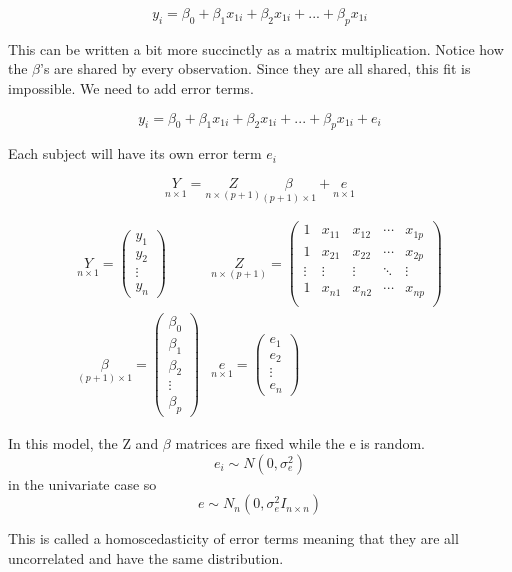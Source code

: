 \[y_i = \beta_0+ \beta_1 x_{1i}+ \beta_2 x_{1i} + ...+\beta_p x_{1i}\]

This can be written a bit more succinctly as a matrix multiplication. Notice how the $\beta$'s are shared by every observation. Since they are all shared, this fit is impossible. We need to add error terms.

\[y_i = \beta_0+ \beta_1 x_{1i}+ \beta_2 x_{1i} + ...+\beta_p x_{1i} +e_i\]

Each subject will have its own error term $e_i$

\[\underset{n\times 1}{Y} =\underset{n\times (p+1)}{Z}\underset{(p+1)\times 1}{\beta} + \underset{n\times 1}{e}\]

\begin{align*}
   \underset{n\times 1}{Y} = \begin{pmatrix}
    y_1 \\ y_2 \\ \vdots \\ y_n
    \end{pmatrix} &
    \underset{n\times (p+1)}{Z} = 
    \begin{pmatrix}
    1 & x_{11} & x_{12} & \cdots & x_{1p} \\
    1 & x_{21} & x_{22} & \cdots & x_{2p} \\
    \vdots & \vdots & \vdots & \ddots & \vdots \\
    1 & x_{n1} & x_{n2} & \cdots & x_{np} \\
\end{pmatrix}
\\
\underset{(p+1)\times 1}{\beta} = \begin{pmatrix}
    \beta_0 \\ \beta_1 \\ \beta_2 \\ \vdots \\ \beta_p
    \end{pmatrix} &
\underset{n\times 1}{e} = \begin{pmatrix}
    e_1 \\ e_2 \\ \vdots \\ e_n
    \end{pmatrix}
\end{align*}

In this model, the Z and $\beta$ matrices are fixed while the e is random.
\[e_i \sim N(0,\sigma_e^2)\] 
in the univariate case so
\[e \sim N_n(0,\sigma_e^2I_{n \times n})\] 

This is called a homoscedasticity of error terms meaning that they are all uncorrelated and have the same distribution.

